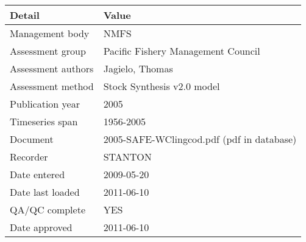\begin{table}[htb]
\centering
\begin{tabular}{lp{7cm}}
\toprule
Detail & Value \\
\midrule
Management body    & NMFS                                      \\
Assessment group   & Pacific Fishery Management Council        \\
Assessment authors & Jagielo, Thomas                           \\
Assessment method  & Stock Synthesis v2.0 model                \\
Publication year   & 2005                                      \\
Timeseries span    & 1956-2005                                 \\
Document           & 2005-SAFE-WClingcod.pdf (pdf in database) \\
Recorder           & STANTON                                   \\
Date entered       & 2009-05-20                                \\
Date last loaded   & 2011-06-10                                \\
QA/QC complete     & YES                                       \\
Date approved      & 2011-06-10                                \\
\bottomrule
\end{tabular}
\label{tab:assessdet}
\end{table}
